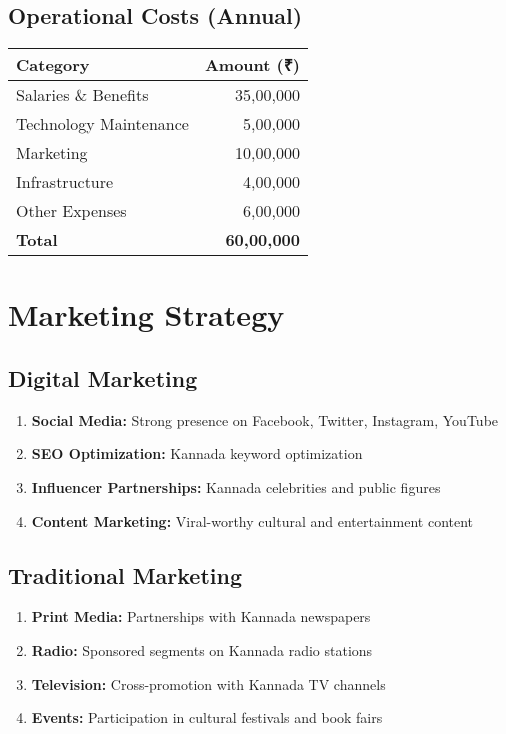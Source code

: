 \documentclass[11pt,a4paper]{article}
\begin{document}
\subsection{Operational Costs (Annual)}
\begin{center}
\begin{tabular}{lr}
\toprule
\textbf{Category} & \textbf{Amount (₹)} \\
\midrule
Salaries \& Benefits & 35,00,000 \\
Technology Maintenance & 5,00,000 \\
Marketing & 10,00,000 \\
Infrastructure & 4,00,000 \\
Other Expenses & 6,00,000 \\
\midrule
\textbf{Total} & \textbf{60,00,000} \\
\bottomrule
\end{tabular}
\end{center}

\section{Marketing Strategy}

\subsection{Digital Marketing}
\begin{enumerate}[leftmargin=2em]
    \item \textbf{Social Media:} Strong presence on Facebook, Twitter, Instagram, YouTube
    \item \textbf{SEO Optimization:} Kannada keyword optimization
    \item \textbf{Influencer Partnerships:} Kannada celebrities and public figures
    \item \textbf{Content Marketing:} Viral-worthy cultural and entertainment content
\end{enumerate}

\subsection{Traditional Marketing}
\begin{enumerate}[leftmargin=2em]
    \item \textbf{Print Media:} Partnerships with Kannada newspapers
    \item \textbf{Radio:} Sponsored segments on Kannada radio stations
    \item \textbf{Television:} Cross-promotion with Kannada TV channels
    \item \textbf{Events:} Participation in cultural festivals and book fairs
\end{enumerate}
\end{document}
